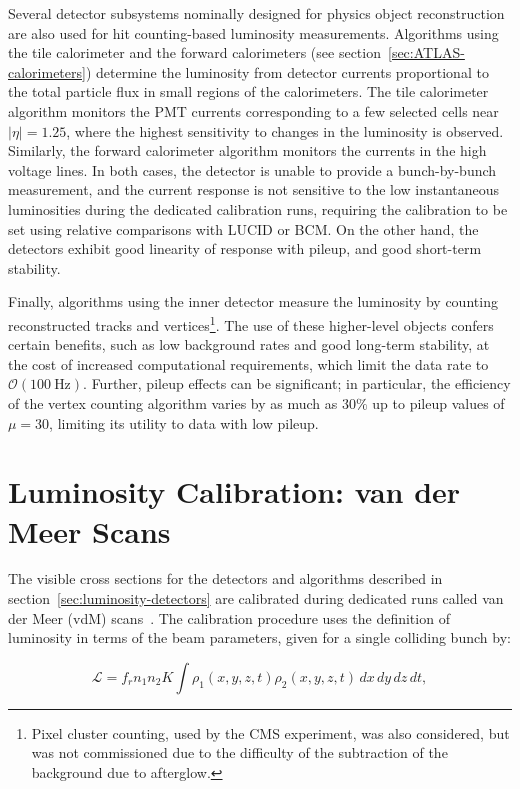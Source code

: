 Several detector subsystems nominally designed for physics object reconstruction are also used for hit counting-based luminosity measurements. Algorithms using the tile calorimeter and the forward calorimeters (see section~\ref{sec:ATLAS-calorimeters}) determine the luminosity from detector currents proportional to the total particle flux in small regions of the calorimeters. The tile calorimeter algorithm monitors the PMT currents corresponding to a few selected cells near $|\eta|=1.25$, where the highest sensitivity to changes in the luminosity is observed. Similarly, the forward calorimeter algorithm monitors the currents in the high voltage lines. In both cases, the detector is unable to provide a bunch-by-bunch measurement, and the current response is not sensitive to the low instantaneous luminosities during the dedicated calibration runs, requiring the calibration to be set using relative comparisons with LUCID or BCM. On the other hand, the detectors exhibit good linearity of response with pileup, and good short-term stability. 

Finally, algorithms using the inner detector measure the luminosity by counting reconstructed tracks and vertices\footnote{Pixel cluster counting, used by the CMS experiment, was also considered, but was not commissioned due to the difficulty of the subtraction of the background due to afterglow.}. The use of these higher-level objects confers certain benefits, such as low background rates and good long-term stability, at the cost of increased computational requirements, which limit the data rate to $\mathcal{O}(\SI{100}{\hertz})$. Further, pileup effects can be significant; in particular, the efficiency of the vertex counting algorithm varies by as much as $30\%$ up to pileup values of $\mu=30$, limiting its utility to data with low pileup. 

\section{Luminosity Calibration: van der Meer Scans}\label{sec:luminosity-calibration}
The visible cross sections for the detectors and algorithms described in section~\ref{sec:luminosity-detectors} are calibrated during dedicated runs called van der Meer (vdM) scans~\cite{vanderMeer:1968ud}. The calibration procedure uses the definition of luminosity in terms of the beam parameters, given for a single colliding bunch by:

\begin{equation}\label{eqn:luminosity-geometrical}
	\mathcal{L} = f_r n_1 n_2 K \int \rho_1(x,y,z,t) \rho_2(x,y,z,t)\, dx\,dy\,dz\,dt,
\end{equation}

